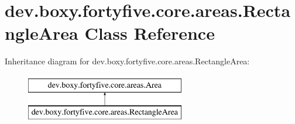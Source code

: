 \hypertarget{classdev_1_1boxy_1_1fortyfive_1_1core_1_1areas_1_1_rectangle_area}{
\section{dev.boxy.fortyfive.core.areas.RectangleArea Class Reference}
\label{d2/d2f/classdev_1_1boxy_1_1fortyfive_1_1core_1_1areas_1_1_rectangle_area}
}
Inheritance diagram for dev.boxy.fortyfive.core.areas.RectangleArea:\begin{figure}[H]
\begin{center}
\leavevmode
\includegraphics[height=2.000000cm]{d2/d2f/classdev_1_1boxy_1_1fortyfive_1_1core_1_1areas_1_1_rectangle_area}
\end{center}
\end{figure}
